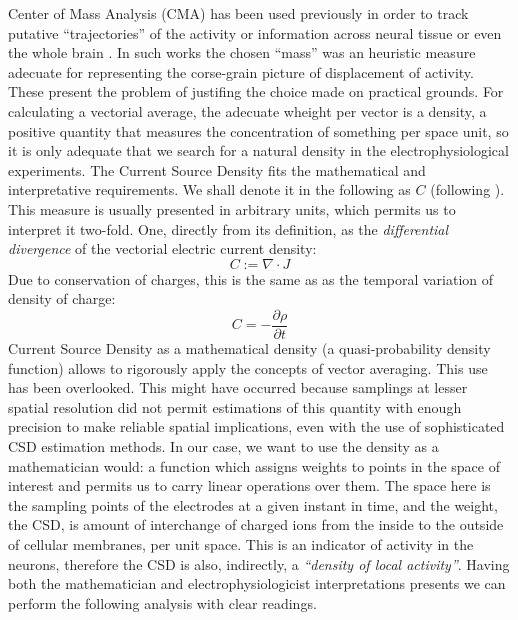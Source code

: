 \documentclass[12pt]{article}
\begin{document}
Center of Mass Analysis (CMA) has been used previously in order to track putative  ``trajectories'' of the activity or information across neural tissue or even the whole brain \cite{Chao05, Chao07, Manjarrez07, Manjarrez09}. In such works the chosen ``mass'' was an heuristic measure adecuate for representing the corse-grain picture of displacement of activity. These present the problem of justifing the choice made on practical grounds. For calculating a vectorial average, the adecuate wheight per vector is a density, a positive quantity that measures the concentration of something per space unit, so it is only adequate that we search for a natural density in the electrophysiological experiments. The Current Source Density fits the mathematical and interpretative requirements. We shall denote it in the following as $C$ (following \cite{Potworowski2011}).  This measure is usually presented in arbitrary units, which permits us to interpret it two-fold. One, directly from its definition, as the \emph{differential divergence} of the vectorial electric current density:
\begin{equation}
  C:=\nabla \cdot J
\end{equation}
Due to conservation of charges, this is the same as as the temporal variation of density of charge:
\begin{equation}
  C=-\frac{\partial \rho}{\partial t}
\end{equation}
Current Source Density as a mathematical density (a quasi-probability density function)  allows  to rigorously apply the concepts of vector averaging. This use has been overlooked. This might have occurred because  samplings at lesser spatial resolution did not permit estimations of this quantity with enough precision to make reliable spatial implications, even with the use of sophisticated CSD estimation methods. In our case, we want to use the density as a mathematician would: a function which assigns weights to points in the space of interest and permits us to carry linear operations over them.  The space here is the sampling points of the electrodes at a given instant in time, and the weight, the CSD, is amount of interchange of charged ions from the inside to the outside of cellular membranes, per unit space.  This is an indicator of activity in the neurons, therefore the CSD is also, indirectly, a \emph{``density of local activity''}. Having both
the mathematician and electrophysiologicist interpretations presents we can
perform the following analysis with clear readings. 
\end{document}
